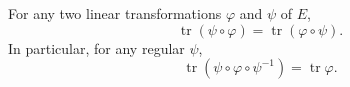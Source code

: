 For any two linear transformations $\varphi$ and $\psi$ of $E$,
$$\operatorname{tr} (\psi \circ \varphi) = \operatorname{tr} (\varphi \circ \psi).$$
In particular, for any regular $\psi$,
$$\operatorname{tr} (\psi \circ \varphi \circ \psi^{-1}) = \operatorname{tr} \varphi.$$
